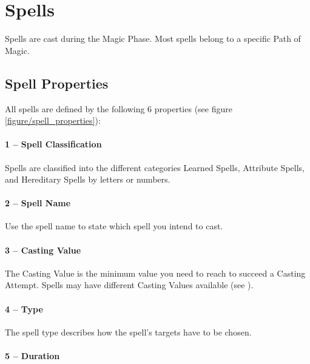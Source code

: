 \section{Spells}
\label{spells}

Spells are cast during the Magic Phase. Most spells belong to a specific Path of Magic.

\columnbreak

\subsection{Spell Properties}
\label{spell_properties}

All spells are defined by the following 6 properties (see figure \ref{figure/spell_properties}):

\paragraph{1 -- Spell Classification}

Spells are classified into the different categories Learned Spells, Attribute Spells, and Hereditary Spells by letters or numbers.

\paragraph{2 -- Spell Name}

Use the spell name to state which spell you intend to cast.

\paragraph{3 -- Casting Value}

The Casting Value is the minimum value you need to reach to succeed a Casting Attempt. Spells may have different Casting Values available (see ).

\paragraph{4 -- Type}

The spell type describes how the spell's targets have to be chosen.

\paragraph{5 -- Duration}


